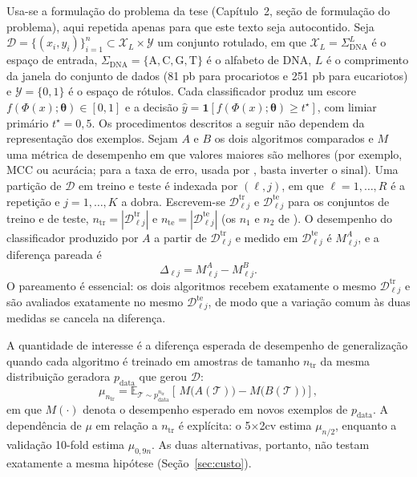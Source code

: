 \documentclass[11pt,a4paper]{article}
\newcommand{\tr}{\mathrm{tr}}
\newcommand{\te}{\mathrm{te}}
\newcommand{\Dtr}[1]{\mathcal{D}^{\tr}_{#1}}
\newcommand{\Dte}[1]{\mathcal{D}^{\te}_{#1}}
\newcommand{\E}{\mathbb{E}}
\begin{document}
Usa-se a formulação do problema da tese (Capítulo~2, seção de formulação do
problema), aqui repetida apenas para que este texto seja autocontido. Seja
$\mathcal{D}=\{(x_i,y_i)\}_{i=1}^{n}\subset\mathcal{X}_L\times\mathcal{Y}$ um
conjunto rotulado, em que $\mathcal{X}_L=\Sigma_{\mathrm{DNA}}^{L}$ é o espaço
de entrada, $\Sigma_{\mathrm{DNA}}=\{\mathrm{A},\mathrm{C},\mathrm{G},
\mathrm{T}\}$ é o alfabeto de DNA, $L$ é o comprimento da janela do conjunto
de dados (81 pb para procariotos e 251 pb para eucariotos) e
$\mathcal{Y}=\{0,1\}$ é o espaço de rótulos. Cada classificador produz um
escore $f(\Phi(x);\boldsymbol{\theta})\in[0,1]$ e a decisão $\hat y=\mathbf{1}[f(\Phi(x);\boldsymbol{\theta})\ge t^{\star}]$, com
limiar primário $t^{\star}=0{,}5$. Os procedimentos descritos a seguir não
dependem da representação dos exemplos.
Sejam $A$ e $B$ os dois algoritmos comparados e $M$ uma métrica de desempenho
em que valores maiores são melhores (por exemplo, MCC ou acurácia; para a taxa
de erro, usada por \citet{dietterich1998approximate}, basta inverter o sinal).
Uma partição de $\mathcal{D}$ em treino e teste é indexada por $(\ell,j)$, em que
$\ell=1,\dots,R$ é a repetição e $j=1,\dots,K$ a dobra. Escrevem-se
$\Dtr{\ell j}$ e $\Dte{\ell j}$ para os conjuntos de treino e de teste,
$n_{\tr}=|\Dtr{\ell j}|$ e $n_{\te}=|\Dte{\ell j}|$ (os $n_1$ e $n_2$ de
\citet{nadeau2003inference}). O desempenho do classificador produzido por $A$
a partir de $\Dtr{\ell j}$ e medido em $\Dte{\ell j}$ é $M^{A}_{\ell j}$, e a diferença
pareada é
\begin{equation}
  \Delta_{\ell j}=M^{A}_{\ell j}-M^{B}_{\ell j}.
  \label{eq:diferenca}
\end{equation}
O pareamento é essencial: os dois algoritmos recebem exatamente o mesmo
$\Dtr{\ell j}$ e são avaliados exatamente no mesmo $\Dte{\ell j}$, de modo que a
variação comum às duas medidas se cancela na diferença.

A quantidade de interesse é a diferença esperada de desempenho de
generalização quando cada algoritmo é treinado em amostras de tamanho
$n_{\tr}$ da mesma distribuição geradora $p_{\text{data}}$ que gerou $\mathcal{D}$:
\begin{equation}
  \mu_{n_{\tr}}=\E_{\mathcal{T}\sim p_{\text{data}}^{n_{\tr}}}\!\left[\,M\bigl(A(\mathcal{T})\bigr)-M\bigl(B(\mathcal{T})\bigr)\right],
  \label{eq:estimando}
\end{equation}
em que $M(\cdot)$ denota o desempenho esperado em novos exemplos de $p_{\text{data}}$. A
dependência de $\mu$ em relação a $n_{\tr}$ é explícita: o 5$\times$2cv
estima $\mu_{n/2}$, enquanto a validação 10-fold estima $\mu_{0{,}9n}$. As duas
alternativas, portanto, não testam exatamente a mesma hipótese
(Seção~\ref{sec:custo}).
\end{document}
